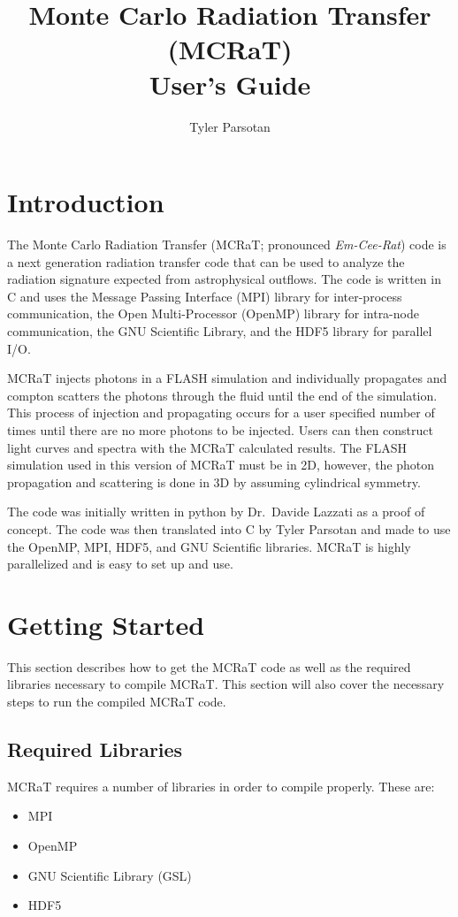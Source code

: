 \documentclass[12pt,a4paper]{article}
\title{Monte Carlo Radiation Transfer (MCRaT)\\User's Guide}
\author{Tyler Parsotan}
\date{}
\begin{document}
\maketitle

\tableofcontents
\newpage

\section{Introduction}
The Monte Carlo Radiation Transfer (MCRaT; pronounced \textit{Em-Cee-Rat}) code is a next generation radiation transfer code that can be used to analyze the radiation signature expected from astrophysical outflows. The code is written in C and uses the Message Passing Interface (MPI) library for inter-process communication, the Open Multi-Processor (OpenMP) library for intra-node communication, the GNU Scientific Library, and the HDF5 library for parallel I/O.

MCRaT injects photons in a FLASH simulation and individually propagates and compton scatters the photons through the fluid until the end of the simulation. This process of injection and propagating occurs for a user specified number of times until there are no more photons to be injected. Users can then construct light curves and spectra with the MCRaT calculated results. The FLASH simulation used in this version of MCRaT must be in 2D, however, the photon propagation and scattering is done in 3D by assuming cylindrical symmetry.

The code was initially written in python by Dr.\ Davide Lazzati as a proof of concept. The code was then translated into C by Tyler Parsotan and made to use the OpenMP, MPI, HDF5, and GNU Scientific libraries. MCRaT is highly parallelized and is easy to set up and use.


\section{Getting Started}
This section describes how to get the MCRaT code as well as the required libraries necessary to compile MCRaT. This section will also cover the necessary steps to run the compiled MCRaT code. 

\subsection{Required Libraries}
MCRaT requires a number of libraries in order to compile properly. These are:
\begin{itemize}
\item MPI
\item OpenMP
\item GNU Scientific Library (GSL)
\item HDF5
\end{itemize}
\end{document}

